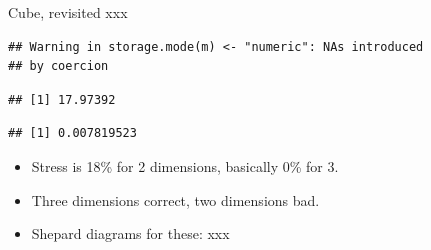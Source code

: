 \documentclass[ignorenonframetext,]{beamer}
\newenvironment{Shaded}{\begin{snugshade}}{\end{snugshade}}
\newcommand{\DataTypeTok}[1]{\textcolor[rgb]{0.13,0.29,0.53}{#1}}
\newcommand{\DecValTok}[1]{\textcolor[rgb]{0.00,0.00,0.81}{#1}}
\newcommand{\FloatTok}[1]{\textcolor[rgb]{0.00,0.00,0.81}{#1}}
\newcommand{\KeywordTok}[1]{\textcolor[rgb]{0.13,0.29,0.53}{\textbf{#1}}}
\newcommand{\NormalTok}[1]{#1}
\newcommand{\OperatorTok}[1]{\textcolor[rgb]{0.81,0.36,0.00}{\textbf{#1}}}
\newcommand{\StringTok}[1]{\textcolor[rgb]{0.31,0.60,0.02}{#1}}
\begin{document}
\begin{frame}[fragile]{Cube, revisited xxx}
\protect\hypertarget{cube-revisited-xxx}{}

\small

\begin{Shaded}
\end{Shaded}

\begin{verbatim}
## Warning in storage.mode(m) <- "numeric": NAs introduced
## by coercion
\end{verbatim}

\begin{Shaded}
\end{Shaded}

\begin{verbatim}
## [1] 17.97392
\end{verbatim}

\begin{Shaded}
\end{Shaded}

\begin{verbatim}
## [1] 0.007819523
\end{verbatim}

\normalsize

\begin{itemize}
\item
  Stress is 18\% for 2 dimensions, basically 0\% for 3.
\item
  Three dimensions correct, two dimensions bad.
\item
  Shepard diagrams for these: xxx
\end{itemize}


\end{frame}
\end{document}
